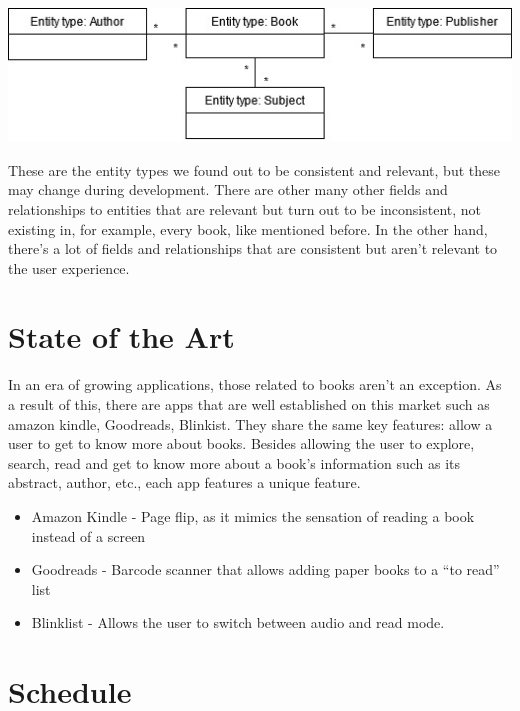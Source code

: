 \documentclass[twocolumn,twoside,11pt,a4paper]{article}
\begin{document}
\begin{dataFigure}
    \centering\includegraphics[width=1.0\linewidth]{dataModel.jpg}
\end{dataFigure}

These are the entity types we found out to be consistent and relevant, but these may change during development. There are other many other fields and relationships to entities that are relevant but turn out to be inconsistent, not existing in, for example, every book, like mentioned before. In the other hand, there's a lot of fields and relationships that are consistent but aren't relevant to the user experience.


\section{State of the Art}\label{sec:conclusions}

 In an era of growing applications, those related to books aren’t an exception. As a result of this, there are apps that are well established on this market such as amazon kindle, Goodreads, Blinkist. They share the same key features: allow a user to get to know more about books. Besides allowing the user to explore, search, read and get to know more about a book’s information such as its abstract, author, etc., each app features a unique feature.

\begin{itemize}
    \item Amazon Kindle - Page flip, as it mimics the sensation of reading a book instead of a screen
    \item Goodreads - Barcode scanner that allows adding paper books to a “to read” list
    \item Blinklist - Allows the user to switch between audio and read mode.
\end{itemize}


\section{Schedule}\label{sec:conclusions}
\end{document}
